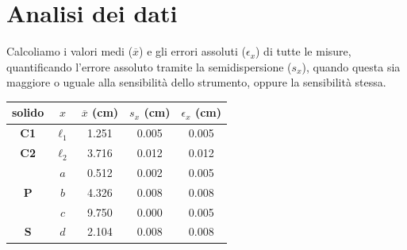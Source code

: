 \documentclass[12pt]{scrartcl}
\begin{document}
\section{Analisi dei dati}

Calcoliamo i valori medi (\(\overline{x}\)) e gli errori assoluti (\(\epsilon_x\))
di tutte le misure, quantificando l'errore assoluto tramite la semidispersione
(\(s_x\)), quando questa sia maggiore o uguale alla sensibilità dello strumento,
oppure la sensibilità stessa.

\begin{center}\begin{tabular}{ccccc}
  \toprule
  \textbf{solido} & \(x\) & \(\overline{x}\) (\si{\centi\metre}) & \(s_x\) (\si{\centi\metre}) & \(\epsilon_x\) (\si{\centi\metre}) \\
  \midrule
  \textbf{C1} & \(\ell_1\) & \num{1.251} & \num{0.005} & \num{0.005} \\
  \midrule
  \textbf{C2} & \(\ell_2\) & \num{3.716} & \num{0.012} & \num{0.012} \\
  \midrule
  \multirow{3}{*}{\textbf{P}} & \(a\) & \num{0.512} & \num{0.002} & \num{0.005} \\
                              & \(b\) & \num{4.326} & \num{0.008} & \num{0.008} \\
                              & \(c\) & \num{9.750} & \num{0.000} & \num{0.005} \\
  \midrule
  \textbf{S} & \(d\) & \num{2.104} & \num{0.008} & \num{0.008} \\
  \bottomrule
\end{tabular}\end{center}
\end{document}
